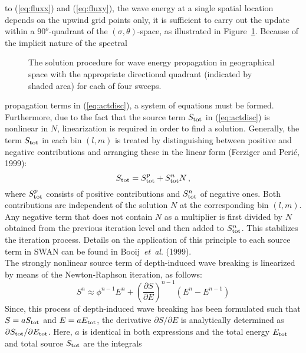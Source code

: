 \documentclass[12pt]{book}
\begin{document}
to (\ref{eq:fluxx}) and (\ref{eq:fluxy}), the wave energy at a single spatial location depends on the
upwind grid points only, it is sufficient to carry out the update within a $90^o$-quadrant of the
$(\sigma,\theta)$-space, as illustrated in Figure~\ref{fig:4sweep}. Because of the implicit nature of the spectral
\begin{figure}[htb]
   \centerline{
              }
      \caption{The solution procedure for wave energy propagation in geographical space with the appropriate
               directional quadrant (indicated by shaded area) for each of four sweeps.}
      \label{fig:4sweep}
\end{figure}
propagation terms in (\ref{eq:actdisc}), a system of equations must
be formed.
Furthermore, due to the fact that the source term $S_{\rm tot}$ in (\ref{eq:actdisc}) is nonlinear in $N$,
linearization
is required in order to find a solution. Generally, the term $S_{\rm tot}$ in each bin $(l,m)$ is treated by
distinguishing between positive and negative contributions and arranging these in the linear form
(Ferziger and Peri\'{c}, 1999):
\begin{equation}
  S_{\rm tot} = S_{\rm tot}^p + S_{\rm tot}^n N \, ,
  \label{eq:srcpn}
\end{equation}
where $S_{\rm tot}^p$ consists of positive contributions and
$S_{\rm tot}^n$ of negative ones. Both contributions are independent of the solution $N$ at the corresponding bin $(l,m)$.
Any negative term that does not contain $N$ as a multiplier is first
divided by $N$ obtained from the previous iteration level and then added to $S_{\rm tot}^n$.
This stabilizes the iteration process.
Details on the application of this principle to each source term in SWAN can be found in Booij~{\it et~al}. (1999).
\\[2ex]
\noindent
The strongly nonlinear source term of depth-induced wave breaking is linearized by means of the Newton-Raphson iteration,
as follows:
\begin{equation}
  S^n \approx \phi^{n-1} E^{n} + \left( \frac{\partial S}{\partial E} \right)^{n-1} (E^n - E^{n-1})
\end{equation}
Since, this process of depth-induced wave breaking has been formulated such that $S = aS_{\rm tot}$ and $E = aE_{\rm tot}$,
the derivative $\partial S/\partial E$ is analytically determined as $\partial S_{\rm tot}/\partial E_{\rm tot}$. Here,
$a$ is identical in both expressions and the total energy $E_{\rm tot}$ and total source $S_{\rm tot}$ are the integrals
\end{document}
